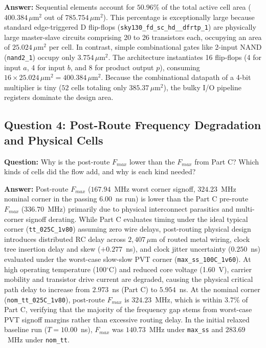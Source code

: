 \documentclass[12pt]{article}
\begin{document}
{\textbf{Answer:} 
Sequential elements account for $50.96\%$ of the total active cell area ($400.384\,\mu\text{m}^2$ out of $785.754\,\mu\text{m}^2$). This percentage is exceptionally large because standard edge-triggered D flip-flops (\texttt{sky130\_fd\_sc\_hd\_\_dfrtp\_1}) are physically large master-slave circuits comprising 20 to 26 transistors each, occupying an area of $25.024\,\mu\text{m}^2$ per cell. In contrast, simple combinational gates like 2-input NAND (\texttt{nand2\_1}) occupy only $3.754\,\mu\text{m}^2$. The architecture instantiates 16 flip-flops (4 for input $a$, 4 for input $b$, and 8 for product output $p$), consuming $16 \times 25.024\,\mu\text{m}^2 = 400.384\,\mu\text{m}^2$. Because the combinational datapath of a 4-bit multiplier is tiny ($52$ cells totaling only $385.37\,\mu\text{m}^2$), the bulky I/O pipeline registers dominate the design area.

\subsection{Question 4: Post-Route Frequency Degradation and Physical Cells}
\textbf{Question:} Why is the post-route $F_{max}$ lower than the $F_{max}$ from Part C? Which kinds of cells did the flow add, and why is each kind needed?

\textbf{Answer:} 
Post-route $F_{max}$ ($167.94$~MHz worst corner signoff, $324.23$~MHz nominal corner in the passing 6.00~ns run) is lower than the Part C pre-route $F_{max}$ ($336.70$~MHz) primarily due to physical interconnect parasitics and multi-corner signoff derating. While Part C evaluates timing under the ideal typical corner (\texttt{tt\_025C\_1v80}) assuming zero wire delays, post-routing physical design introduces distributed RC delay across $2,407\,\mu\text{m}$ of routed metal wiring, clock tree insertion delay and skew ($+0.277$~ns), and clock jitter uncertainty ($0.250$~ns) evaluated under the worst-case slow-slow PVT corner (\texttt{max\_ss\_100C\_1v60}). At high operating temperature (100$^\circ$C) and reduced core voltage (1.60~V), carrier mobility and transistor drive current are degraded, causing the physical critical path delay to increase from $2.973$~ns (Part C) to $5.954$~ns. At the nominal corner (\texttt{nom\_tt\_025C\_1v80}), post-route $F_{max}$ is $324.23$~MHz, which is within $3.7\%$ of Part C, verifying that the majority of the frequency gap stems from worst-case PVT signoff margins rather than excessive routing delay. In the initial relaxed baseline run ($T = 10.00$~ns), $F_{max}$ was $140.73$~MHz under \texttt{max\_ss} and $283.69$~MHz under \texttt{nom\_tt}.

}
\end{document}

